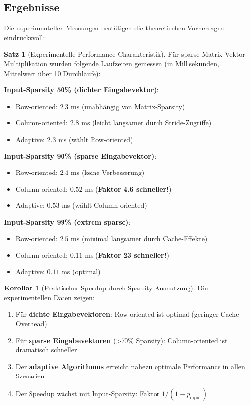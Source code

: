 ﻿\documentclass[a4paper,12pt]{report}
\theoremstyle{definition}
\newtheorem{satz}{Satz}
\newtheorem{korollar}{Korollar}
\begin{document}
	\subsection{Ergebnisse}
	
	Die experimentellen Messungen bestätigen die theoretischen Vorhersagen eindrucksvoll:
	
	\begin{satz}[Experimentelle Performance-Charakteristik]
		Für sparse Matrix-Vektor-Multipli\-kation wurden folgende Laufzeiten gemessen (in Millisekunden, Mittelwert über 10 Durchläu\-fe):
		
		\textbf{Input-Sparsity 50\% (dichter Eingabevektor)}:
		\begin{itemize}
			\item Row-oriented: $2.3$ ms (unabhängig von Matrix-Sparsity)
			\item Column-oriented: $2.8$ ms (leicht langsamer durch Stride-Zugriffe)
			\item Adaptive: $2.3$ ms (wählt Row-oriented)
		\end{itemize}
		
		\textbf{Input-Sparsity 90\% (sparse Eingabevektor)}:
		\begin{itemize}
			\item Row-oriented: $2.4$ ms (keine Verbesserung)
			\item Column-oriented: $0.52$ ms (\textbf{Faktor 4.6 schneller!})
			\item Adaptive: $0.53$ ms (wählt Column-oriented)
		\end{itemize}
		
		\textbf{Input-Sparsity 99\% (extrem sparse)}:
		\begin{itemize}
			\item Row-oriented: $2.5$ ms (minimal langsamer durch Cache-Effekte)
			\item Column-oriented: $0.11$ ms (\textbf{Faktor 23 schneller!})
			\item Adaptive: $0.11$ ms (optimal)
		\end{itemize}
	\end{satz}
	
	\begin{korollar}[Praktischer Speedup durch Sparsity-Ausnutzung]
		Die experimentellen Daten zeigen:
		\begin{enumerate}
			\item Für \textbf{dichte Eingabevektoren}: Row-oriented ist optimal (geringer Cache-Overhead)
			\item Für \textbf{sparse Eingabevektoren} (>70\% Sparsity): Column-oriented ist dramatisch schneller
			\item Der \textbf{adaptive Algorithmus} erreicht nahezu optimale Performance in allen Szenarien
			\item Der Speedup wächst mit Input-Sparsity: Faktor $1/(1-p_{\text{input}})$
		\end{enumerate}
	\end{korollar}
	
\end{document}
